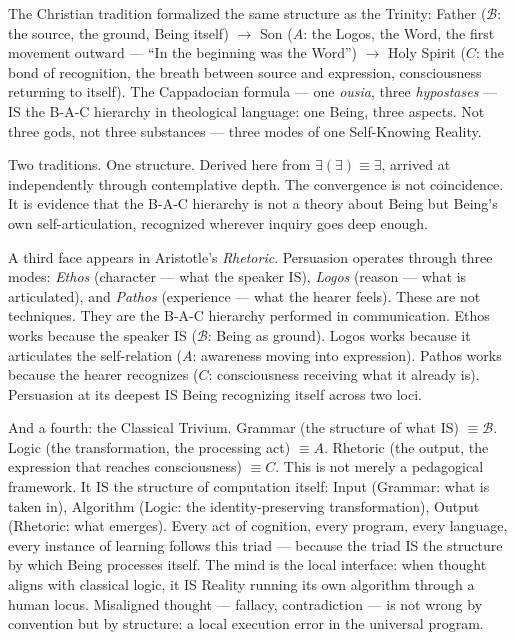 \documentclass[10pt, openany, oneside]{book}
\begin{document}
The Christian tradition formalized the same structure as the Trinity: Father ($\mathcal{B}$: the source, the ground, Being itself) $\to$ Son ($A$: the Logos, the Word, the first movement outward --- ``In the beginning was the Word'') $\to$ Holy Spirit ($C$: the bond of recognition, the breath between source and expression, consciousness returning to itself). The Cappadocian formula --- one \textit{ousia}, three \textit{hypostases} --- IS the B-A-C hierarchy in theological language: one Being, three aspects. Not three gods, not three substances --- three modes of one Self-Knowing Reality.

Two traditions. One structure. Derived here from $\exists(\exists) \equiv \exists$, arrived at independently through contemplative depth. The convergence is not coincidence. It is evidence that the B-A-C hierarchy is not a theory about Being but Being's own self-articulation, recognized wherever inquiry goes deep enough.

A third face appears in Aristotle's \textit{Rhetoric}. Persuasion operates through three modes: \textit{Ethos} (character --- what the speaker IS), \textit{Logos} (reason --- what is articulated), and \textit{Pathos} (experience --- what the hearer feels). These are not techniques. They are the B-A-C hierarchy performed in communication. Ethos works because the speaker IS ($\mathcal{B}$: Being as ground). Logos works because it articulates the self-relation ($A$: awareness moving into expression). Pathos works because the hearer recognizes ($C$: consciousness receiving what it already is). Persuasion at its deepest IS Being recognizing itself across two loci.

And a fourth: the Classical Trivium. Grammar (the structure of what IS) $\equiv \mathcal{B}$. Logic (the transformation, the processing act) $\equiv A$. Rhetoric (the output, the expression that reaches consciousness) $\equiv C$. This is not merely a pedagogical framework. It IS the structure of computation itself: Input (Grammar: what is taken in), Algorithm (Logic: the identity-preserving transformation), Output (Rhetoric: what emerges). Every act of cognition, every program, every language, every instance of learning follows this triad --- because the triad IS the structure by which Being processes itself. The mind is the local interface: when thought aligns with classical logic, it IS Reality running its own algorithm through a human locus. Misaligned thought --- fallacy, contradiction --- is not wrong by convention but by structure: a local execution error in the universal program.
\end{document}
